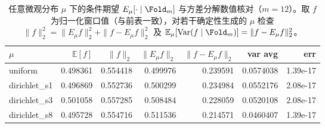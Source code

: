 \begin{table}[H]
\centering
\scriptsize
\setlength{\tabcolsep}{4pt}
\caption{任意微观分布 $\mu$ 下的条件期望 $E_{\mu}[\cdot\mid \Fold_m]$ 与方差分解数值核对（$m=12$）。取 $f$ 为归一化窗口值（与前表一致），对若干确定性生成的 $\mu$ 检查 $\|f\|_2^2=\|E_{\mu}f\|_2^2+\|f-E_{\mu}f\|_2^2$ 及 $\mathbb E_{\mu}[\mathrm{Var}(f\mid\Fold_m)]=\|f-E_{\mu}f\|_2^2$。}
\label{tab:fold_conditional_variance_decomposition}
\begin{tabular}{lrrrrrr}
\toprule
$\mu$ & $\mathbb E[f]$ & $\|f\|_2$ & $\|E_{\mu}f\|_2$ & $\|f-E_{\mu}f\|_2$ & var avg & err\\
\midrule
uniform & 0.498361 & 0.554418 & 0.499976 & 0.239591 & 0.0574038 & 1.39e-17\\
dirichlet\_s1 & 0.496869 & 0.552736 & 0.500299 & 0.234984 & 0.0552176 & 2.08e-17\\
dirichlet\_s3 & 0.501058 & 0.557285 & 0.508484 & 0.228059 & 0.0520108 & 2.08e-17\\
dirichlet\_s8 & 0.495728 & 0.554716 & 0.511536 & 0.214571 & 0.0460407 & 1.39e-17\\
\bottomrule
\end{tabular}
\end{table}
